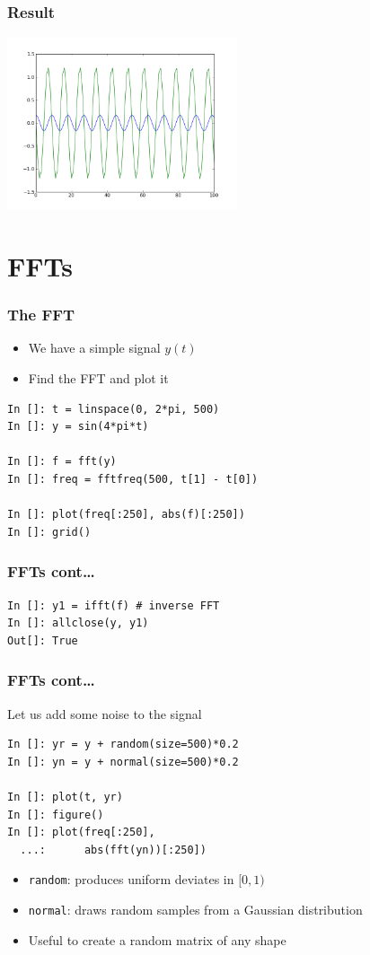 \documentclass[14pt,compress]{beamer}
\newcommand{\typ}[1]{\lstinline{#1}}
\begin{document}
\begin{frame}[fragile]
\frametitle{Result}
\begin{center}
\includegraphics[height=2in, interpolate=true]{data/ode}  
\end{center}
\end{frame}

\section{FFTs}

\begin{frame}[fragile]
\frametitle{The FFT}
\begin{itemize}
    \item We have a simple signal $y(t)$
    \item Find the FFT and plot it
\end{itemize}
\begin{lstlisting}
In []: t = linspace(0, 2*pi, 500)
In []: y = sin(4*pi*t)

In []: f = fft(y)
In []: freq = fftfreq(500, t[1] - t[0])

In []: plot(freq[:250], abs(f)[:250])
In []: grid()
\end{lstlisting} 
\end{frame}

\begin{frame}[fragile]
\frametitle{FFTs cont\dots}
\begin{lstlisting}
In []: y1 = ifft(f) # inverse FFT
In []: allclose(y, y1)
Out[]: True
\end{lstlisting} 
\end{frame}

\begin{frame}[fragile]
\frametitle{FFTs cont\dots}
Let us add some noise to the signal
\begin{lstlisting}
In []: yr = y + random(size=500)*0.2
In []: yn = y + normal(size=500)*0.2

In []: plot(t, yr)
In []: figure()
In []: plot(freq[:250],
  ...:      abs(fft(yn))[:250])
\end{lstlisting}
\begin{itemize}
    \item \typ{random}: produces uniform deviates in $[0, 1)$
    \item \typ{normal}: draws random samples from a Gaussian
        distribution
    \item Useful to create a random matrix of any shape
\end{itemize}
\end{frame}
\end{document}
